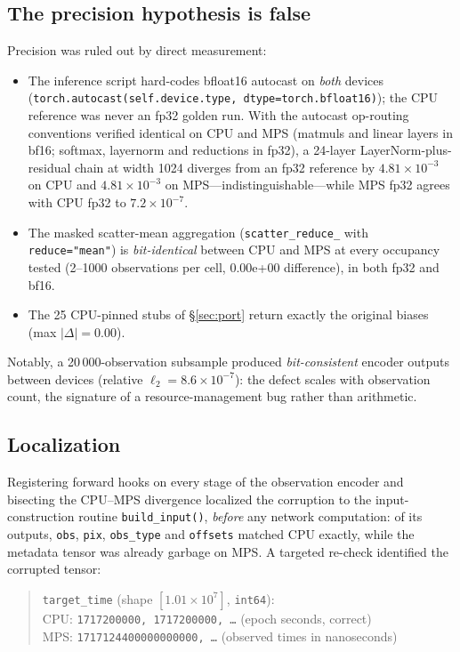\documentclass[twocolumn,11pt]{article}
\begin{document}
\subsection{The precision hypothesis is false}
Precision was ruled out by direct measurement:
\begin{itemize}
\item The inference script hard-codes bfloat16 autocast on
\emph{both} devices
(\texttt{torch.autocast(self.device.type, dtype=torch.bfloat16)});
the CPU reference was never an fp32 golden run. With the autocast
op-routing conventions verified identical on CPU and MPS (matmuls and
linear layers in bf16; softmax, layernorm and reductions in fp32),
a 24-layer LayerNorm-plus-residual chain at width 1024 diverges from
an fp32 reference by $4.81\times10^{-3}$ on CPU and
$4.81\times10^{-3}$ on MPS---indistinguishable---while MPS fp32
agrees with CPU fp32 to $7.2\times10^{-7}$.
\item The masked scatter-mean aggregation
(\texttt{scatter\_reduce\_} with \texttt{reduce="mean"}) is
\emph{bit-identical} between CPU and MPS at every occupancy tested
(2--1000 observations per cell, 0.00e+00 difference), in both fp32
and bf16.
\item The 25 CPU-pinned stubs of \S\ref{sec:port} return exactly the
original biases (max $|\Delta| = 0.00$).
\end{itemize}
Notably, a 20\,000-observation subsample produced
\emph{bit-consistent} encoder outputs between devices
(relative $\ell_2 = 8.6\times10^{-7}$): the defect scales with
observation count, the signature of a resource-management bug rather
than arithmetic.

\subsection{Localization}
Registering forward hooks on every stage of the observation encoder
and bisecting the CPU--MPS divergence localized the corruption to the
input-construction routine \texttt{build\_input()}, \emph{before} any
network computation: of its outputs, \texttt{obs}, \texttt{pix},
\texttt{obs\_type} and \texttt{offsets} matched CPU exactly, while
the metadata tensor was already garbage on MPS. A targeted re-check
identified the corrupted tensor:

\begin{quote}\small
\texttt{target\_time} (shape $[1.01\times10^{7}]$, \texttt{int64}):\\
CPU: \texttt{1717200000, 1717200000, \ldots} (epoch seconds, correct)\\
MPS: \texttt{1717124400000000000, \ldots} (observed times in
nanoseconds)
\end{quote}
\end{document}
